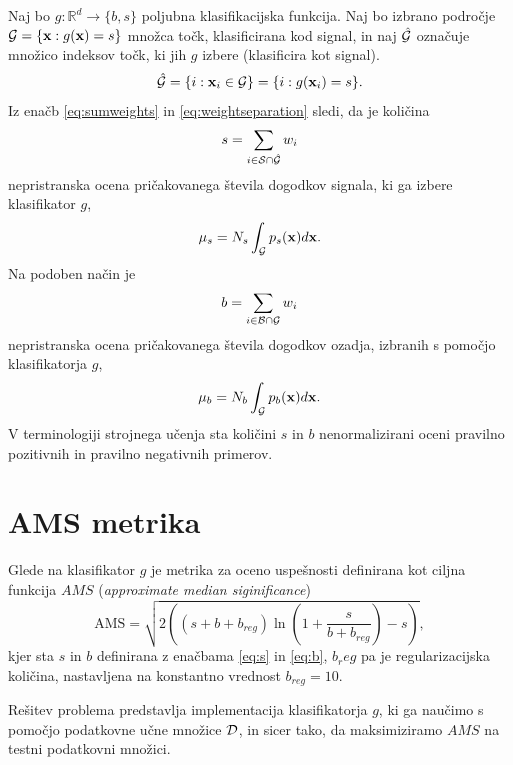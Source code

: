 \documentclass[11pt,a4paper,openany]{book}
\begin{document}
Naj bo $g : \mathbb{R}^d \rightarrow \{b, s\}$ poljubna klasifikacijska funkcija. Naj bo izbrano področje ${\cal G} = \{\textbf{x} : g(\textbf{x}) = s\}$ množca točk, klasificirana kod signal, in naj $\hat{\cal G}$ označuje množico indeksov točk, ki jih $g$ izbere (klasificira kot signal).
\begin{equation*}
\hat{\cal G} = \{ i : \textbf{x}_i \in {\cal G}\} = \{ i : g(\textbf{x}_i) = s \}.
\end{equation*}
Iz enačb \ref{eq:sumweights} in \ref{eq:weightseparation} sledi, da je količina
\begin{eqnarray}
	s = \sum_{i \in {\cal S} \cap {\hat{\cal G}}} w_i
	\label{eq:s}
\end{eqnarray}
nepristranska ocena pričakovanega števila dogodkov signala, ki ga izbere klasifikator $g$,
\begin{eqnarray}
	\mu_s = N_s \int_{\cal G}p_s(\mathbf{x})d\mathbf{x}.
\end{eqnarray}
Na podoben način je
\begin{eqnarray}
	b = \sum_{i \in {\cal B} \cap {\cal G}} w_i
	\label{eq:b}
\end{eqnarray}
nepristranska ocena pričakovanega števila dogodkov ozadja, izbranih s pomočjo klasifikatorja $g$,
\begin{eqnarray}
	\mu_b = N_b \int_{\cal G}p_b(\mathbf{x})d\mathbf{x}.
\end{eqnarray}
V terminologiji strojnega učenja sta količini $s$ in $b$ nenormalizirani oceni pravilno pozitivnih in pravilno negativnih primerov.
\section{AMS metrika}
\label{sc:ams}
Glede na klasifikator $g$ je metrika za oceno uspešnosti definirana kot ciljna funkcija $AMS$ (\textit{approximate median siginificance})
\begin{equation}
\text{AMS} = \sqrt{2 \left( ( s + b + b_{reg} ) \ln \left( 1 +  \frac{s}{b + b_{reg}} \right) - s \right) },
\label{en:ams}
\end{equation}
kjer sta $s$ in $b$ definirana z enačbama \ref{eq:s} in \ref{eq:b}, $b_reg$ pa je regularizacijska količina, nastavljena na konstantno vrednost $b_{reg} = 10$.

Rešitev problema predstavlja implementacija klasifikatorja $g$, ki ga naučimo s pomočjo podatkovne učne množice ${\cal D}$, in sicer tako, da maksimiziramo $AMS$ na testni podatkovni množici.

\end{document}
